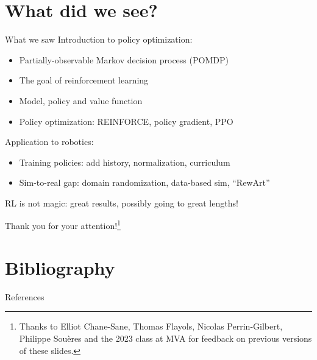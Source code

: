 \documentclass[10pt, aspectratio=1610]{beamer}
\begin{document}
\section{What did we see?}

\begin{frame}{What we saw}
    Introduction to policy optimization:
    \begin{itemize}
        \item Partially-observable Markov decision process (POMDP)
        \item The goal of reinforcement learning
        \item Model, policy and value function
        \item Policy optimization: REINFORCE, policy gradient, PPO
    \end{itemize}
    Application to robotics:
    \begin{itemize}
        \item Training policies: add history, normalization, curriculum
        \item Sim-to-real gap: domain randomization, data-based sim, ``RewArt''
    \end{itemize}
    RL is not magic: great results, possibly going to great lengths!
\end{frame}

\begin{frame}[standout]
    Thank you for your attention!\footnote{\color{white} Thanks to Elliot Chane-Sane, Thomas Flayols, Nicolas Perrin-Gilbert, Philippe Sou\`{e}res and the 2023 class at MVA for feedback on previous versions of these slides.}
\end{frame}

\section*{Bibliography}

\renewcommand*{\bibfont}{\footnotesize}
\begin{frame}[allowframebreaks]{References}
    \printbibliography[heading=none]
\end{frame}
\end{document}
